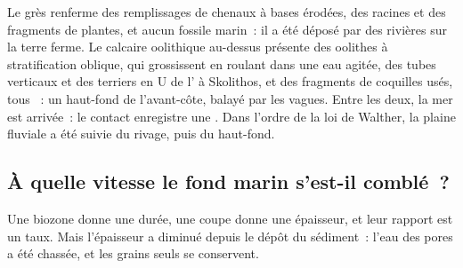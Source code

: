 \begin{omfigure}
\par{}
\end{omfigure}

\begin{example}\label{ex:b2:palaeoenvironments:base}
Le grès renferme des remplissages de chenaux à bases érodées, des racines et des fragments de plantes, et aucun
fossile marin~: il a été déposé par des rivières sur la terre ferme. Le calcaire oolithique au-dessus présente
des oolithes à stratification oblique, qui grossissent en roulant dans une eau agitée, des tubes verticaux et des
terriers en U de l' à Skolithos, et des fragments de coquilles usés, tous ~: un haut-fond
de l'avant-côte, balayé par les vagues. Entre les deux, la mer est arrivée~: le contact enregistre une . Dans l'ordre de la loi de Walther, la plaine fluviale a été suivie du rivage, puis du haut-fond.
\end{example}

\subsection*{À quelle vitesse le fond marin s'est-il comblé~?}

Une biozone donne une durée, une coupe donne une épaisseur, et leur
rapport est un taux. Mais l'épaisseur a diminué depuis le dépôt du sédiment~:
l'eau des pores a été chassée, et les grains seuls se conservent.


